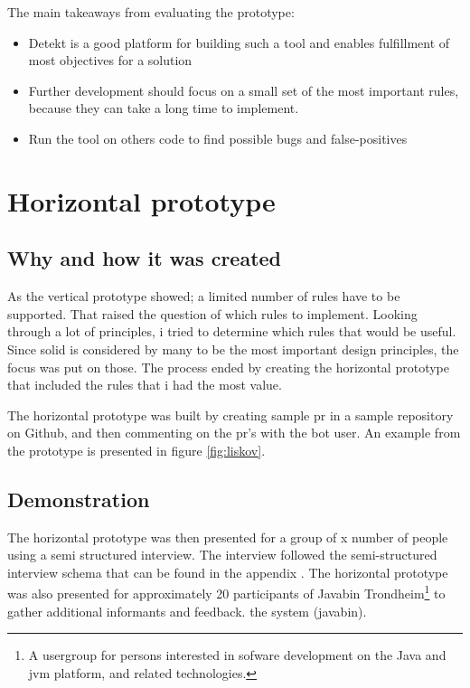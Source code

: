 \documentclass{report}
\begin{document}
The main takeaways from evaluating the prototype:
\begin{itemize}
    \item Detekt is a good platform for building such a tool and enables fulfillment of most objectives for a solution
    \item Further development should focus on a small set of the most important rules, because they can take a long time to implement.
    \item Run the tool on others code to find possible bugs and false-positives
\end{itemize}

\section{Horizontal prototype}
\subsection*{Why and how it was created}
As the vertical prototype showed; a limited number of rules have to be supported. That raised the question of which rules to implement. Looking through a lot of principles, i tried to determine which rules that would be useful. Since \gls{solid} is considered by many to be the most important design principles, the focus was put on those. The process ended by creating the horizontal prototype that included the rules that i had the most value. 


The horizontal prototype was built by creating sample \gls{pr} in a sample repository on Github\cite{sample-repository}, and then commenting on the \gls{pr}'s with the bot user. An example from the prototype is presented in figure \ref{fig:liskov}.

\subsection*{Demonstration}
The horizontal prototype was then presented for a group of x number of people using a semi structured interview. The interview followed the semi-structured interview schema that can be found in the appendix \cite{}. The horizontal prototype was also presented for approximately 20 participants of Javabin Trondheim\footnote{A usergroup for persons interested in sofware development on the Java and \gls{jvm} platform, and related technologies.} to gather additional informants and feedback. the system (javabin). 
\end{document}
